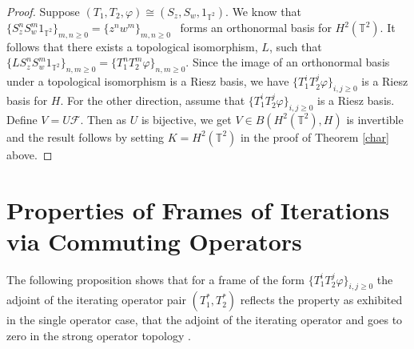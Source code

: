 \documentclass[12pt,reqno]{amsart}
\theoremstyle{definition}
\theoremstyle{definition}
\numberwithin{equation}{section}
\begin{document}
\begin{proof}
Suppose  $(T_1, T_2, \varphi) \cong (S_z, S_w, {1}_{\mathbb{T}^2})$. We know that  $\{S_{z}^n S_{w}^m {1}_{\mathbb{T}^2}\}_{m,n \geq 0} = \{z^nw^m\}_{m,n \geq 0}$ \,  forms an orthonormal basis for $H^2(\mathbb{T}^2)$. It follows that there exists a topological isomorphism, $L$, such that $\{L S_{z}^n S_{w}^m {1}_{\mathbb{T}^2}\}_{n,m \geq 0} = \{T_1^nT_2^m\varphi\}_{n,m \geq 0}$. Since the image of an orthonormal basis under a topological isomorphism is a Riesz basis, we have  $\{T_1^iT_2^j\varphi\}_{i,j \geq 0}$ is a Riesz basis for $H$.
For the other direction, assume that $\{T_1^iT_2^j\varphi\}_{i,j \geq 0}$ is a Riesz basis. Define $V = U \mathcal{F}$. Then as $U$ is bijective, we get $V \in B(H^2(\mathbb{T}^2), H)$ is invertible and the result follows by setting $K = H^2(\mathbb{T}^2)$ in the proof of Theorem \ref{char} above.
\end{proof}
\section{Properties of Frames of Iterations via Commuting Operators}
The following proposition shows that for a frame of the form $\{T_1^iT_2^j\varphi\}_{i,j \geq 0}$ the adjoint of the iterating operator pair $(T^*_1, T^*_2)$ reflects the property as exhibited in the single operator case, that the adjoint of the  iterating operator and goes to zero in the strong operator topology \cite{AA17}. 
\end{document}
